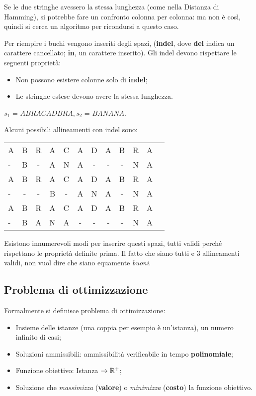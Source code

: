 Se le due stringhe avessero la stessa lunghezza (come nella Distanza di Hamming), si potrebbe fare un confronto colonna per colonna: ma non è così, quindi si cerca un algoritmo per ricondursi a questo caso.

Per riempire i buchi vengono inseriti degli spazi, (\textbf{indel}, dove \textbf{del} indica un carattere cancellato; \textbf{in}, un carattere inserito). Gli indel devono rispettare le seguenti proprietà: \begin{itemize}
    \item Non possono esistere colonne solo di \textbf{indel};
    \item Le stringhe estese devono avere la stessa lunghezza.
\end{itemize}

\newpage
\begin{example}{}{}
$s_1$ = $ABRACADBRA, s_2$ = $BANANA$.

Alcuni possibili allineamenti con indel sono:
\begin{center}
\begin{tabular}{l *{11}{c}}
	A & B & R & A & C & A & D & A & B & R & A \\
	- & B & - & A & N & A & - & - & - & N & A \\
	\hline
	A & B & R & A & C & A & D & A & B & R & A \\
	- & - & - & B & - & A & N & A & - & N & A \\
	\hline
	A & B & R & A & C & A & D & A & B & R & A \\
	- & B & A & N & A & - & - & - & - & N & A
\end{tabular}
\end{center}

Esistono innumerevoli modi per inserire questi spazi, tutti validi perché rispettano le proprietà definite prima.
Il fatto che siano tutti e 3 allineamenti validi, non vuol dire che siano equamente \textit{buoni}.
\end{example}

\subsection{Problema di ottimizzazione}
Formalmente si definisce problema di ottimizzazione: \begin{itemize}
    \item Insieme delle istanze (una coppia per esempio è un'istanza), un numero infinito di casi;
    \item Soluzioni ammissibili: ammissibilità verificabile in tempo \textbf{polinomiale};
    \item Funzione obiettivo: Istanza $\rightarrow \mathbb{R}^+$;
    \item Soluzione che \textit{massimizza} (\textbf{valore}) o \textit{minimizza} (\textbf{costo})  la funzione obiettivo.
\end{itemize}

